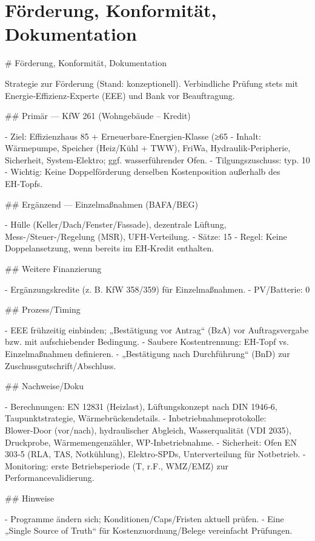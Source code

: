 \documentclass[11pt,oneside]{report}
\begin{document}
\chapter{Förderung, Konformität, Dokumentation}
\begin{markdown}
# Förderung, Konformität, Dokumentation

Strategie zur Förderung (Stand: konzeptionell). Verbindliche Prüfung stets mit Energie‑Effizienz‑Experte (EEE) und Bank vor Beauftragung.

## Primär — KfW 261 (Wohngebäude – Kredit)

- Ziel: Effizienzhaus 85 + Erneuerbare‑Energien‑Klasse (≥65 %
- Inhalt: Wärmepumpe, Speicher (Heiz/Kühl + TWW), FriWa, Hydraulik‑Peripherie, Sicherheit, System‑Elektro; ggf. wasserführender Ofen.
- Tilgungszuschuss: typ. 10 %
- Wichtig: Keine Doppelförderung derselben Kostenposition außerhalb des EH‑Topfs.

## Ergänzend — Einzelmaßnahmen (BAFA/BEG)

- Hülle (Keller/Dach/Fenster/Fassade), dezentrale Lüftung, Mess‑/Steuer‑/Regelung (MSR), UFH‑Verteilung.
- Sätze: 15 %
- Regel: Keine Doppelansetzung, wenn bereits im EH‑Kredit enthalten.

## Weitere Finanzierung

- Ergänzungskredite (z. B. KfW 358/359) für Einzelmaßnahmen.
- PV/Batterie: 0 %

## Prozess/Timing

- EEE frühzeitig einbinden; „Bestätigung vor Antrag“ (BzA) vor Auftragsvergabe bzw. mit aufschiebender Bedingung.
- Saubere Kostentrennung: EH‑Topf vs. Einzelmaßnahmen definieren.
- „Bestätigung nach Durchführung“ (BnD) zur Zuschussgutschrift/Abschluss.

## Nachweise/Doku

- Berechnungen: EN 12831 (Heizlast), Lüftungskonzept nach DIN 1946‑6, Taupunktstrategie, Wärmebrückendetails.
- Inbetriebnahmeprotokolle: Blower‑Door (vor/nach), hydraulischer Abgleich, Wasserqualität (VDI 2035), Druckprobe, Wärmemengenzähler, WP‑Inbetriebnahme.
- Sicherheit: Ofen EN 303‑5 (RLA, TAS, Notkühlung), Elektro‑SPDs, Unterverteilung für Notbetrieb.
- Monitoring: erste Betriebsperiode (T, r.F., WMZ/EMZ) zur Performancevalidierung.

## Hinweise

- Programme ändern sich; Konditionen/Caps/Fristen aktuell prüfen.
- Eine „Single Source of Truth“ für Kostenzuordnung/Belege vereinfacht Prüfungen.
\end{markdown}
\end{document}

